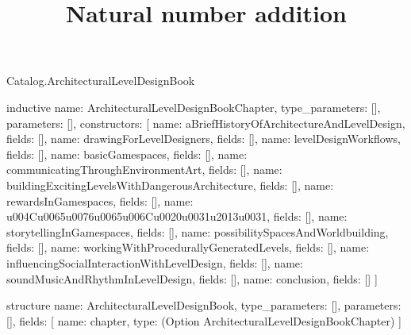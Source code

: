 \begin{lexlean}{Catalog.ArchitecturalLevelDesignBook}
\title{Natural number addition}
\begin{semanticmodule}
inductive{
  name: ArchitecturalLevelDesignBookChapter,
  type_parameters: [],
  parameters: [],
  constructors: [
    {name: aBriefHistoryOfArchitectureAndLevelDesign, fields: []},
    {name: drawingForLevelDesigners, fields: []},
    {name: levelDesignWorkflows, fields: []},
    {name: basicGamespaces, fields: []},
    {name: communicatingThroughEnvironmentArt, fields: []},
    {name: buildingExcitingLevelsWithDangerousArchitecture, fields: []},
    {name: rewardsInGamespaces, fields: []},
    {name: u004Cu0065u0076u0065u006Cu0020u0031u2013u0031, fields: []},
    {name: storytellingInGamespaces, fields: []},
    {name: possibilitySpacesAndWorldbuilding, fields: []},
    {name: workingWithProcedurallyGeneratedLevels, fields: []},
    {name: influencingSocialInteractionWithLevelDesign, fields: []},
    {name: soundMusicAndRhythmInLevelDesign, fields: []},
    {name: conclusion, fields: []}
  ]
}

structure{
  name: ArchitecturalLevelDesignBook,
  type_parameters: [],
  parameters: [],
  fields: [
    {name: chapter, type: (Option ArchitecturalLevelDesignBookChapter)}
  ]
}
\end{semanticmodule}
\end{lexlean}
